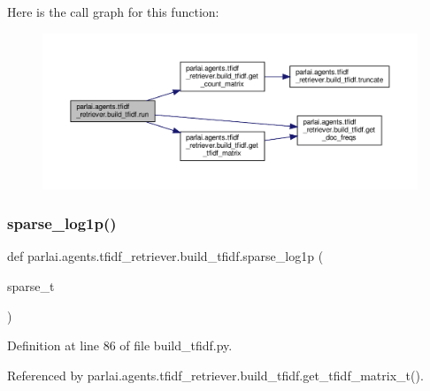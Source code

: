Here is the call graph for this function\+:
\nopagebreak
\begin{figure}[H]
\begin{center}
\leavevmode
\includegraphics[width=350pt]{namespaceparlai_1_1agents_1_1tfidf__retriever_1_1build__tfidf_a0d8cca9dbdf0fa23d25e81ec2a96b347_cgraph}
\end{center}
\end{figure}
\mbox{\label{namespaceparlai_1_1agents_1_1tfidf__retriever_1_1build__tfidf_a89650718966a5b0d1114e8b06b8c0dcc}} 
\subsubsection{\texorpdfstring{sparse\+\_\+log1p()}{sparse\_log1p()}}
{\footnotesize\ttfamily def parlai.\+agents.\+tfidf\+\_\+retriever.\+build\+\_\+tfidf.\+sparse\+\_\+log1p (\begin{DoxyParamCaption}\item[{}]{sparse\+\_\+t }\end{DoxyParamCaption})}



Definition at line 86 of file build\+\_\+tfidf.\+py.



Referenced by parlai.\+agents.\+tfidf\+\_\+retriever.\+build\+\_\+tfidf.\+get\+\_\+tfidf\+\_\+matrix\+\_\+t().

